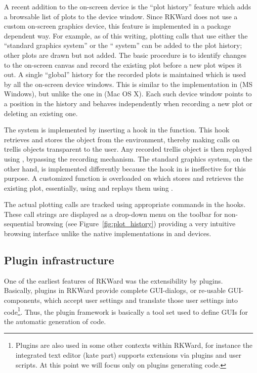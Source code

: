 A recent addition to the on-screen device is the ``plot history'' feature which
adds a browsable list of plots to the device window. Since RKWard does not use a
custom on-screen graphics device, this feature is implemented in a package
dependent way. For example, as of this writing, plotting calls that use either
the ``standard graphics system'' or the `` system'' can be added to the plot
history; other plots are drawn but not added. The basic procedure is to identify
changes to the on-screen canvas and record the existing plot before a new plot
wipes it out. A single ``global'' history for the recorded plots is maintained
which is used by all the on-screen device windows. This is similar to the
implementation in  (MS Windows), but unlike the one in  
(Mac OS X). Each such device window points to a position in the history
and behaves independently when recording a new plot or deleting an existing
one.

The  system is implemented by inserting a hook in the 
function. This hook retrieves and stores the  object from the
 environment, thereby making  calls on trellis
objects transparent to the user. Any recorded trellis object is then replayed
using , bypassing the recording mechanism. The standard graphics
system, on the other hand, is implemented differently because the hook in
 is ineffective for this purpose. A customized function is overloaded
on  which stores and retrieves the existing plot, essentially, using
 and replays them using .

The actual plotting calls are tracked using appropriate  commands in
the hooks. These call strings are displayed as a drop-down menu on the toolbar
for non-sequential browsing (see Figure~\ref{fig:plot_history}) providing a very intuitive browsing
interface unlike the native implementations in  and  devices.

\subsection{Plugin infrastructure}
\label{sec:technical_plugins}
One of the earliest features of RKWard was the extensibility by plugins.
Basically, plugins in RKWard provide complete GUI-dialogs, or re-usable
GUI-components, which accept user settings and translate those user settings
into  code\footnote{
    Plugins are also used in some other contexts within RKWard, for instance the
    integrated text editor (kate part) supports extensions via plugins and user scripts. At this point we
    will focus only on plugins generating  code.
}. Thus, the plugin framework is basically a tool set used to define
GUIs for the automatic generation of  code.

